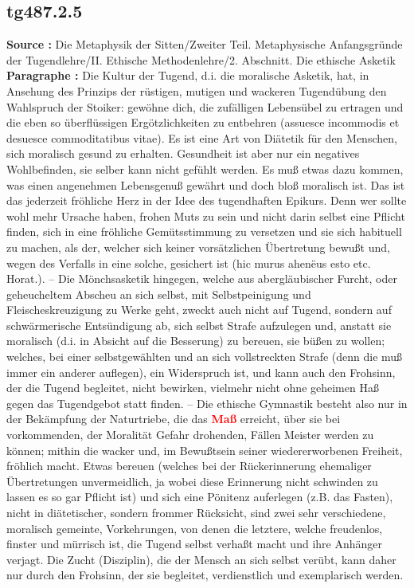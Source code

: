 \documentclass[a4paper,12pt,twoside]{book}
\newcommand{\match}[1]{\textcolor{red}{\textbf{#1}}}
\begin{document}
	\subsection*{tg487.2.5} 
	\textbf{Source : }Die Metaphysik der Sitten/Zweiter Teil. Metaphysische Anfangsgründe der Tugendlehre/II. Ethische Methodenlehre/2. Abschnitt. Die ethische Asketik\\  
	
	\textbf{Paragraphe : }Die Kultur der Tugend, d.i. die moralische Asketik, hat, in Ansehung des Prinzips der rüstigen, mutigen und wackeren Tugendübung den Wahlspruch der Stoiker: gewöhne dich, die zufälligen Lebensübel zu ertragen und die eben so überflüssigen Ergötzlichkeiten zu entbehren (assuesce incommodis et desuesce commoditatibus vitae). Es ist eine Art von Diätetik für den Menschen, sich moralisch gesund zu erhalten. Gesundheit ist aber nur ein negatives  Wohlbefinden, sie selber kann nicht gefühlt werden. Es muß etwas dazu kommen, was einen angenehmen Lebensgenuß gewährt und doch bloß moralisch ist. Das ist das jederzeit fröhliche Herz in der Idee des tugendhaften Epikurs. Denn wer sollte wohl mehr Ursache haben, frohen Muts zu sein und nicht darin selbst eine Pflicht finden, sich in eine fröhliche Gemütsstimmung zu versetzen und sie sich habituell zu machen, als der, welcher sich keiner vorsätzlichen Übertretung bewußt und, wegen des Verfalls in eine solche, gesichert ist (hic murus ahenëus esto etc. Horat.). – Die Mönchsasketik hingegen, welche aus abergläubischer Furcht, oder geheucheltem Abscheu an sich selbst, mit Selbstpeinigung und Fleischeskreuzigung zu Werke geht, zweckt auch nicht auf Tugend, sondern auf schwärmerische Entsündigung ab, sich selbst Strafe aufzulegen und, anstatt sie moralisch (d.i. in Absicht auf die Besserung) zu bereuen, sie büßen zu wollen; welches, bei einer selbstgewählten und an sich vollstreckten Strafe (denn die muß immer ein anderer auflegen), ein Widerspruch ist, und kann auch den Frohsinn, der die Tugend begleitet, nicht bewirken, vielmehr nicht ohne geheimen Haß gegen das Tugendgebot statt finden. – Die ethische Gymnastik besteht also nur in der Bekämpfung der Naturtriebe, die das \match{Maß} erreicht, über sie bei vorkommenden, der Moralität Gefahr drohenden, Fällen Meister werden zu können; mithin die wacker und, im Bewußtsein seiner wiedererworbenen Freiheit, fröhlich macht. Etwas bereuen (welches bei der Rückerinnerung ehemaliger Übertretungen unvermeidlich, ja wobei diese Erinnerung nicht schwinden zu lassen es so gar Pflicht ist) und sich eine Pönitenz auferlegen (z.B. das Fasten), nicht in diätetischer, sondern frommer Rücksicht, sind zwei sehr verschiedene, moralisch gemeinte, Vorkehrungen, von denen die letztere, welche freudenlos, finster und mürrisch ist, die Tugend selbst verhaßt macht und ihre Anhänger verjagt. Die Zucht (Disziplin), die der Mensch an sich selbst verübt, kann daher nur durch den Frohsinn, der sie begleitet, verdienstlich und exemplarisch werden. 
	
\end{document}
